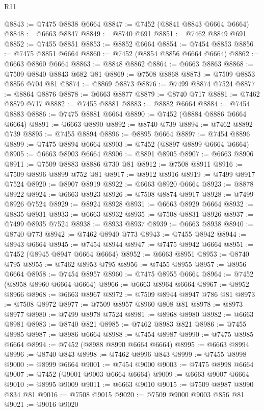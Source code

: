 \begin{lexlean}{R11}
\begin{coremodule}
{{{{{{{{{{{{{{{{{{{{{{{{{{{{{{{{{{{{{{{{{{{{{{{{{{{{{{{{{{{{{{{{{{{{{{{{{{{{{{{{{{@8843 := @7475 @8838 @6664
@8847 := @7452 (@8841 @8843 @6664 @6664)
@8848 := @6663 @8847
@8849 := @8740 @691
@8851 := @7462 @8849 @691
@8852 := @7455 @8851
@8853 := @8852 @6664
@8854 := @7454 @8853
@8856 := @7475 @8851 @6664
@8860 := @7452 (@8854 @8856 @6664 @6664)
@8862 := @6663 @8860 @6664
@8863 := @8848 @8862
@8864 := @6663 @8863
@8868 := @7509 @8840 @8843 @682 @81
@8869 := @7508 @8868
@8873 := @7509 @8853 @8856 @704 @81
@8874 := @8869 @8873
@8876 := @7499 @8874 @7524
@8877 := @8864 @8876
@8878 := @6663 @8877
@8879 := @8740 @717
@8881 := @7462 @8879 @717
@8882 := @7455 @8881
@8883 := @8882 @6664
@8884 := @7454 @8883
@8886 := @7475 @8881 @6664
@8890 := @7452 (@8884 @8886 @6664 @6664)
@8891 := @6663 @8890
@8892 := @8740 @739
@8894 := @7462 @8892 @739
@8895 := @7455 @8894
@8896 := @8895 @6664
@8897 := @7454 @8896
@8899 := @7475 @8894 @6664
@8903 := @7452 (@8897 @8899 @6664 @6664)
@8905 := @6663 @8903 @6664
@8906 := @8891 @8905
@8907 := @6663 @8906
@8911 := @7509 @8883 @8886 @730 @81
@8912 := @7508 @8911
@8916 := @7509 @8896 @8899 @752 @81
@8917 := @8912 @8916
@8919 := @7499 @8917 @7524
@8920 := @8907 @8919
@8922 := @6663 @8920 @6664
@8923 := @8878 @8922
@8924 := @6663 @8923
@8926 := @7508 @8874 @8917
@8928 := @7499 @8926 @7524
@8929 := @8924 @8928
@8931 := @6663 @8929 @6664
@8932 := @8835 @8931
@8933 := @6663 @8932
@8935 := @7508 @8831 @8926
@8937 := @7499 @8935 @7524
@8938 := @8933 @8937
@8939 := @6663 @8938
@8940 := @8740 @773
@8942 := @7462 @8940 @773
@8943 := @7455 @8942
@8944 := @8943 @6664
@8945 := @7454 @8944
@8947 := @7475 @8942 @6664
@8951 := @7452 (@8945 @8947 @6664 @6664)
@8952 := @6663 @8951
@8953 := @8740 @795
@8955 := @7462 @8953 @795
@8956 := @7455 @8955
@8957 := @8956 @6664
@8958 := @7454 @8957
@8960 := @7475 @8955 @6664
@8964 := @7452 (@8958 @8960 @6664 @6664)
@8966 := @6663 @8964 @6664
@8967 := @8952 @8966
@8968 := @6663 @8967
@8972 := @7509 @8944 @8947 @786 @81
@8973 := @7508 @8972
@8977 := @7509 @8957 @8960 @808 @81
@8978 := @8973 @8977
@8980 := @7499 @8978 @7524
@8981 := @8968 @8980
@8982 := @6663 @8981
@8983 := @8740 @821
@8985 := @7462 @8983 @821
@8986 := @7455 @8985
@8987 := @8986 @6664
@8988 := @7454 @8987
@8990 := @7475 @8985 @6664
@8994 := @7452 (@8988 @8990 @6664 @6664)
@8995 := @6663 @8994
@8996 := @8740 @843
@8998 := @7462 @8996 @843
@8999 := @7455 @8998
@9000 := @8999 @6664
@9001 := @7454 @9000
@9003 := @7475 @8998 @6664
@9007 := @7452 (@9001 @9003 @6664 @6664)
@9009 := @6663 @9007 @6664
@9010 := @8995 @9009
@9011 := @6663 @9010
@9015 := @7509 @8987 @8990 @834 @81
@9016 := @7508 @9015
@9020 := @7509 @9000 @9003 @856 @81
@9021 := @9016 @9020
}}}}}}}}}}}}}}}}}}}}}}}}}}}}}}}}}}}}}}}}}}}}}}}}}}}}}}}}}}}}}}}}}}}}}}}}}}}}}}}}}}
\end{coremodule}
\end{lexlean}
